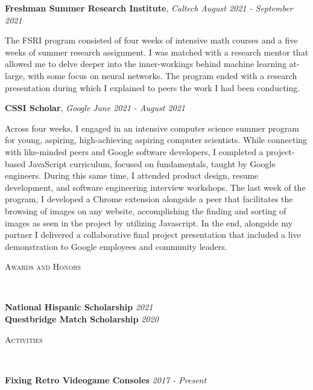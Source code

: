 \documentclass[letterpaper,11pt]{article}
\newcommand{\lineover}{
	\begin{changemargin}{-0.05in}{-0.05in}
		\vspace*{-8pt}
		\hrulefill \\
		\vspace*{-2pt}
	\end{changemargin}
}
\newenvironment{changemargin}[2]{%
  \begin{list}{}{%
    \setlength{\topsep}{0pt}%
    \setlength{\leftmargin}{0}%
    \setlength{\rightmargin}{#2}%
    \setlength{\listparindent}{\parindent}%
    \setlength{\itemindent}{\parindent}%
    \setlength{\parsep}{\parskip}%
  }%
  \item[]}{\end{list}
}
\newcommand{\header}[1]{
	\begin{changemargin}{-0.5in}{-0.5in}
		\scshape{#1}\\
  	\lineover
	\end{changemargin}
}
\newcommand{\jobtitle}[3]{
	\textbf{#1}, \emph{#2} \hfill \emph{#3}\\
}
\newcommand{\jobdescription}[1]{
	\begin{changemargin}{0.15in}{0.15in}
    \smallskip
		{#1}
    \medskip
	\end{changemargin}
}
\newenvironment{body} {
	\vspace*{-16pt}
	\begin{changemargin}{-0.25in}{-0.5in}
  }	
	{\end{changemargin}
}
\begin{document}
\begin{body}
	\vspace{14pt}
  \jobtitle{Freshman Summer Research Institute}{Caltech}{August 2021 - September 2021}
  \jobdescription{
    The FSRI program consisted of four weeks of intensive math courses and a five weeks of summer research assignment. I was matched with a research mentor that allowed me to delve deeper into the inner-workings behind machine learning at-large, with some focus on neural networks. The program ended with a research presentation during which I explained to peers the work I had been conducting.
  }
	\jobtitle{CSSI Scholar}{Google}{June 2021 - August 2021}
  \jobdescription{
    Across four weeks, I engaged in an intensive computer science summer program for young, aspiring, high-achieving aspiring computer scientists. While connecting with like-minded peers and Google software developers, I completed a project-based JavaScript curriculum, focused on fundamentals, taught by Google engineers. During this same time, I attended product design, resume development, and software engineering interview workshops. The last week of the program, I developed a Chrome extension alongside a peer that facilitates the browsing of images on any website, accomplishing the finding and sorting of images as seen in the project by utilizing Javascript. In the end, alongside my partner I delivered a collaborative final project presentation that included a live demonstration to Google employees and community leaders.
  }

\end{body}

\medskip





\header{Awards and Honors}

\begin{body}
	\vspace{14pt}
	\textbf{National Hispanic Scholarship} \hfill{} \emph{2021}\\
	\medskip
	\textbf{Questbridge Match Scholarship} \hfill{} \emph{2020}\\
\end{body}

\medskip


\header{Activities}

\begin{body}
	\vspace{14pt}
	\textbf{Fixing Retro Videogame Consoles} \hfill {} \emph{2017 - Present}\\
	\jobdescription { }
\end{body}
\end{document}
